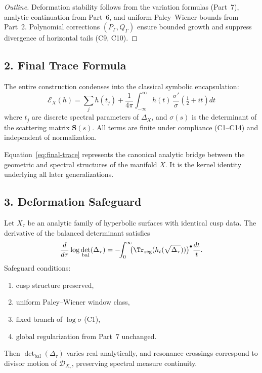 \begin{proof}[Outline]
Deformation stability follows from the variation formulas (Part~7),
analytic continuation from Part~6,
and uniform Paley–Wiener bounds from Part~2.
Polynomial corrections $(P_\Gamma,Q_\Gamma)$ ensure bounded growth
and suppress divergence of horizontal tails (C9, C10).
\end{proof}

\subsection*{2. Final Trace Formula}\relax\hspace{0pt}

The entire construction condenses into the classical symbolic encapsulation:
\begin{equation}
\label{eq:final-trace}
\boxed{
\mathcal{E}_X(h)
= \sum_{j} h(t_j)
+ \frac{1}{4\pi}\!\!\int_{-\infty}^{\infty}\! h(t)\,
\frac{\sigma'}{\sigma}\!\left(\tfrac{1}{2}+it\right)\!dt
}
\end{equation}
where $t_j$ are discrete spectral parameters of $\Delta_X$,
and $\sigma(s)$ is the determinant of the scattering matrix $\mathbf{S}(s)$.
All terms are finite under compliance (C1–C14) and independent of normalization.

Equation~\eqref{eq:final-trace} represents the canonical analytic bridge
between the geometric and spectral structures of the manifold $X$.
It is the kernel identity underlying all later generalizations.

\subsection*{3. Deformation Safeguard}\relax\hspace{0pt}

Let $X_\tau$ be an analytic family of hyperbolic surfaces with identical cusp data.
The derivative of the balanced determinant satisfies
\[
\frac{d}{d\tau}\log\det_{\mathrm{bal}}(\Delta_\tau)
= -\!\!\int_0^\infty\!\!\!
\big(\Tr_{\mathrm{reg}}(h_t(\sqrt{\Delta_\tau}))\big)^{\bullet}\frac{dt}{t}.
\]
Safeguard conditions:
\begin{enumerate}[label=(\roman*)]
\item cusp structure preserved,
\item uniform Paley–Wiener window class,
\item fixed branch of $\log\sigma$ (C1),
\item global regularization from Part~7 unchanged.
\end{enumerate}
Then $\det_{\mathrm{bal}}(\Delta_\tau)$ varies real-analytically,
and resonance crossings correspond to divisor motion of $\mathscr{D}_{X_\tau}$,
preserving spectral measure continuity.

